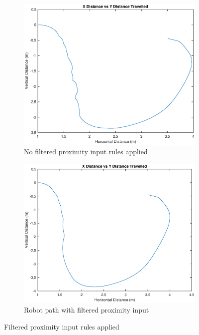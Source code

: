 \documentclass[10pt]{article}
\begin{document}
\begin{figure}[H]
    \centering
    \begin{subfigure}{.5\textwidth}
      \centering
      \includegraphics[scale=0.4]{./figures/SharpTurn_noFilt.eps}
      \caption{No filtered proximity input rules applied}
      \label{fig:filtSub1}
    \end{subfigure}%
    \begin{subfigure}{.5\textwidth}
      \centering
      \includegraphics[scale=0.4]{./figures/SharpTurn_withFilt.eps}
      \caption{Robot path with filtered proximity input}
      \label{fig:filtSub2}
    \end{subfigure}
    \caption{Filtered proximity input rules applied}
    \label{fig:wallFilter}
    \end{figure}
\end{document}
